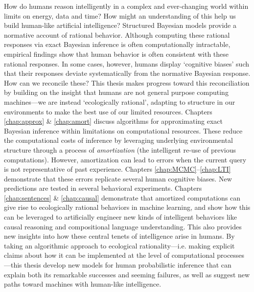 

How do humans reason intelligently in a complex and ever-changing world within limits on energy, data and time? How might an understanding of this help us build human-like artificial intelligence? Structured Bayesian models provide a normative account of rational behavior. Although computing these rational responses via exact Bayesian inference is often computationally intractable, empirical findings show that human behavior is often consistent with these rational responses. In some cases, however, humans display `cognitive biases' such that their responses deviate systematically from the normative Bayesian response. How can we reconcile these? This thesis makes progress toward this reconciliation by building on the insight that humans are not general purpose computing machines---we are instead `ecologically rational', adapting to structure in our environments to make the best use of our limited resources. Chapters \ref{chap:approx} \& \ref{chap:amort} discuss algorithms for approximating exact Bayesian inference within limitations on computational resources. These reduce the computational costs of inference by leveraging underlying environmental structure through a process of \textit{amortization} (the intelligent re-use of previous computations). However, amortization can lead to errors when the current query is not representative of past experience. Chapters \ref{chap:MCMC}--\ref{chap:LTI} demonstrate that these errors replicate several human cognitive biases. New predictions are tested in several behavioral experiments. Chapters \ref{chap:sentences} \& \ref{chap:causal} demonstrate that amortized computations can give rise to ecologically rational behaviors in machine learning, and show how this can be leveraged to artificially engineer new kinds of intelligent behaviors like causal reasoning and compositional language understanding. This also provides new insights into how these central tenets of intelligence arise in humans. By taking an algorithmic approach to ecological rationality---i.e. making explicit claims about how it can be implemented at the level of computational processes---this thesis develop new models for human probabilistic inference that can explain both its remarkable successes and seeming failures, as well as suggest new paths toward machines with human-like intelligence.